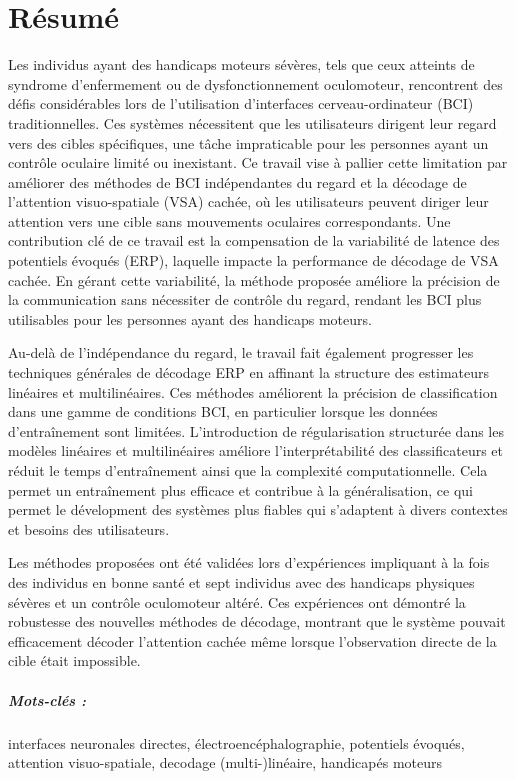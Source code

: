 \chapter*{R\'esum\'e}

Les individus ayant des handicaps moteurs sévères, tels que ceux atteints de
syndrome d'enfermement ou de dysfonctionnement oculomoteur, rencontrent des défis considérables
lors de l'utilisation d'interfaces cerveau-ordinateur (BCI)  traditionnelles.
Ces systèmes nécessitent que les utilisateurs dirigent leur regard vers des
cibles spécifiques, une tâche impraticable pour les personnes ayant un contrôle oculaire limité ou inexistant.
Ce travail vise \`a pallier cette limitation par améliorer des méthodes de BCI
indépendantes du regard et la décodage de l'attention visuo-spatiale (VSA) cachée, où les utilisateurs peuvent diriger leur attention vers une cible sans mouvements oculaires correspondants.
Une contribution clé de ce travail est la compensation de
la variabilité de latence des potentiels évoqués (ERP), laquelle impacte
la performance de décodage de VSA cachée.
En gérant cette variabilit\'e, la méthode proposée améliore la précision de la communication
sans nécessiter de contrôle du regard, rendant les BCI plus utilisables pour les personnes ayant des handicaps moteurs.

Au-delà de l'indépendance du regard, le travail fait également progresser les
techniques générales de décodage ERP en affinant la structure des estimateurs
linéaires et multilinéaires.
Ces méthodes améliorent la précision de classification dans une gamme de
conditions BCI, en particulier lorsque les données d'entraînement sont limitées.
L'introduction de régularisation structurée dans les modèles linéaires et
multilinéaires améliore l'interprétabilité des classificateurs et réduit le temps d'entraînement ainsi que la complexité computationnelle.
Cela permet un entraînement plus efficace et contribue à la g\'en\'eralisation, ce qui
permet le d\'evelopment des systèmes plus fiables qui s'adaptent à divers
contextes et besoins des utilisateurs.

Les méthodes proposées ont été validées lors d'expériences impliquant à la fois
des individus en bonne santé et sept individus avec des handicaps physiques sévères et un contrôle oculomoteur altéré.
Ces expériences ont démontré la robustesse des nouvelles méthodes de décodage, montrant que le système pouvait efficacement décoder l'attention cachée même lorsque l'observation directe de la cible  était impossible.

\paragraph{Mots-clés :}
interfaces neuronales directes,
\'electroenc\'ephalographie,
potentiels \'evoqu\'es,
attention visuo-spatiale,
decodage (multi-)linéaire,
handicap\'es moteurs
